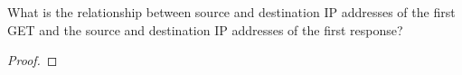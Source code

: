 \documentclass[../../main.tex]{subfiles}
\begin{document}
\begin{wts}
What is the relationship between source and destination IP addresses of the first GET and the source and destination IP addresses of the first response?
\end{wts}
\begin{proof}




\end{proof}
\end{document}
